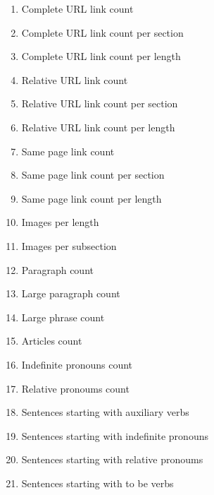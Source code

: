 \begin{enumerate}
	\item Complete URL link count
	\item Complete URL link count per section
	\item Complete URL link count per length
	\item Relative URL link count
	\item Relative URL link count per section
	\item Relative URL link count per length
	\item Same page link count
	\item Same page link count per section
	\item Same page link count per length

	\item Images per length
	\item Images per subsection

	\item Paragraph count
	\item Large paragraph count
	\item Large phrase count
	\item Articles count
	\item Indefinite pronouns count
	\item Relative pronoums count
	
	\item Sentences starting with auxiliary verbs
	\item Sentences starting with indefinite pronouns
	\item Sentences starting with relative pronoums
	\item Sentences starting with to be verbs
\end{enumerate}